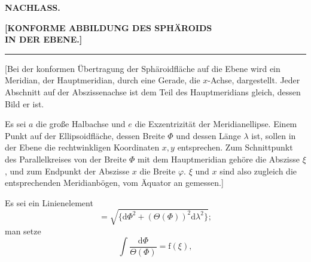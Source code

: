 \par\clearpage\null\thispagestyle{empty}\clearpage
\begin{center}
{\Large\textbf{NACHLASS.}}\par\medskip
{\large\textbf{[KONFORME ABBILDUNG DES SPHÄROIDS\\IN DER EBENE.]}}\par\smallskip
\rule{18mm}{.4pt}\par\medskip
[1.]\par{}
\end{center}
[Bei der konformen Übertragung der Sphäroidfläche auf die Ebene wird ein Meridian, der Hauptmeridian, durch eine Gerade, die \(x\)-Achse, dargestellt. Jeder Abschnitt auf der Abszissenachse ist dem Teil des Hauptmeridians gleich, dessen Bild er ist.

Es sei \(a\) die große Halbachse und \(e\) die Exzentrizität der Meridianellipse. Einem Punkt auf der Ellipsoidfläche, dessen Breite \(\Phi\) und dessen Länge \(\lambda\) ist, sollen in der Ebene die rechtwinkligen Koordinaten \(x,y\) entsprechen. Zum Schnittpunkt des Parallelkreises von der Breite \(\Phi\) mit dem Hauptmeridian gehöre die Abszisse \(\xi\), und zum Endpunkt der Abszisse \(x\) die Breite \(\varphi\). \(\xi\) und \(x\) sind also zugleich die entsprechenden Meridianbögen, vom Äquator an gemessen.]

Es sei ein Linienelement
\[=\sqrt{\{\mathrm d\Phi^2+(\Theta(\Phi))^2\mathrm d\lambda^2\}};\]
\noindent man setze
\[\int\frac{\mathrm d\Phi}{\Theta(\Phi)}=\mathrm f(\xi),\]

